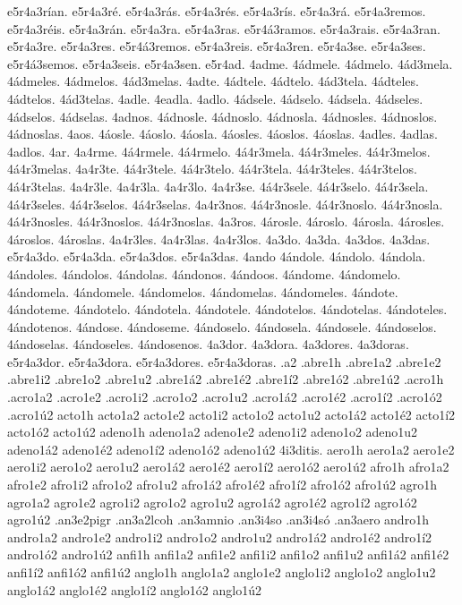 {e5r4a3rían.
e5r4a3ré.
e5r4a3rás.
e5r4a3rés.
e5r4a3rís.
e5r4a3rá.
e5r4a3remos.
e5r4a3réis.
e5r4a3rán.
e5r4a3ra.
e5r4a3ras.
e5r4á3ramos.
e5r4a3rais.
e5r4a3ran.
e5r4a3re.
e5r4a3res.
e5r4á3remos.
e5r4a3reis.
e5r4a3ren.
e5r4a3se.
e5r4a3ses.
e5r4á3semos.
e5r4a3seis.
e5r4a3sen.
e5r4ad.
4adme.
4ádmele.
4ádmelo.
4ád3mela.
4ádmeles.
4ádmelos.
4ád3melas.
4adte.
4ádtele.
4ádtelo.
4ád3tela.
4ádteles.
4ádtelos.
4ád3telas.
4adle.
4eadla.
4adlo.
4ádsele.
4ádselo.
4ádsela.
4ádseles.
4ádselos.
4ádselas.
4adnos.
4ádnosle.
4ádnoslo.
4ádnosla.
4ádnosles.
4ádnoslos.
4ádnoslas.
4aos.
4áosle.
4áoslo.
4áosla.
4áosles.
4áoslos.
4áoslas.
4adles.
4adlas.
4adlos.
4ar.
4a4rme.
4á4rmele.
4á4rmelo.
4á4r3mela.
4á4r3meles.
4á4r3melos.
4á4r3melas.
4a4r3te.
4á4r3tele.
4á4r3telo.
4á4r3tela.
4á4r3teles.
4á4r3telos.
4á4r3telas.
4a4r3le.
4a4r3la.
4a4r3lo.
4a4r3se.
4á4r3sele.
4á4r3selo.
4á4r3sela.
4á4r3seles.
4á4r3selos.
4á4r3selas.
4a4r3nos.
4á4r3nosle.
4á4r3noslo.
4á4r3nosla.
4á4r3nosles.
4á4r3noslos.
4á4r3noslas.
4a3ros.
4árosle.
4ároslo.
4árosla.
4árosles.
4ároslos.
4ároslas.
4a4r3les.
4a4r3las.
4a4r3los.
4a3do.
4a3da.
4a3dos.
4a3das.
e5r4a3do.
e5r4a3da.
e5r4a3dos.
e5r4a3das.
4ando
4ándole.
4ándolo.
4ándola.
4ándoles.
4ándolos.
4ándolas.
4ándonos.
4ándoos.
4ándome.
4ándomelo.
4ándomela.
4ándomele.
4ándomelos.
4ándomelas.
4ándomeles.
4ándote.
4ándoteme.
4ándotelo.
4ándotela.
4ándotele.
4ándotelos.
4ándotelas.
4ándoteles.
4ándotenos.
4ándose.
4ándoseme.
4ándoselo.
4ándosela.
4ándosele.
4ándoselos.
4ándoselas.
4ándoseles.
4ándosenos.
4a3dor.
4a3dora.
4a3dores.
4a3doras.
e5r4a3dor.
e5r4a3dora.
e5r4a3dores.
e5r4a3doras.
.a2
.abre1h
.abre1a2 .abre1e2 .abre1i2 .abre1o2 .abre1u2
.abre1á2 .abre1é2 .abre1í2 .abre1ó2 .abre1ú2
.acro1h
.acro1a2 .acro1e2 .acro1i2 .acro1o2 .acro1u2
.acro1á2 .acro1é2 .acro1í2 .acro1ó2 .acro1ú2
acto1h
acto1a2 acto1e2 acto1i2 acto1o2 acto1u2
acto1á2 acto1é2 acto1í2 acto1ó2 acto1ú2
adeno1h
adeno1a2 adeno1e2 adeno1i2 adeno1o2 adeno1u2
adeno1á2 adeno1é2 adeno1í2 adeno1ó2 adeno1ú2
4i3ditis.
aero1h
aero1a2 aero1e2 aero1i2 aero1o2 aero1u2
aero1á2 aero1é2 aero1í2 aero1ó2 aero1ú2
afro1h
afro1a2 afro1e2 afro1i2 afro1o2 afro1u2
afro1á2 afro1é2 afro1í2 afro1ó2 afro1ú2
agro1h
agro1a2 agro1e2 agro1i2 agro1o2 agro1u2
agro1á2 agro1é2 agro1í2 agro1ó2 agro1ú2
.an3e2pigr
.an3a2lcoh
.an3amnio
.an3i4so
.an3i4só
.an3aero
andro1h
andro1a2 andro1e2 andro1i2 andro1o2 andro1u2
andro1á2 andro1é2 andro1í2 andro1ó2 andro1ú2
anfi1h
anfi1a2 anfi1e2 anfi1i2 anfi1o2 anfi1u2
anfi1á2 anfi1é2 anfi1í2 anfi1ó2 anfi1ú2
anglo1h
anglo1a2 anglo1e2 anglo1i2 anglo1o2 anglo1u2
anglo1á2 anglo1é2 anglo1í2 anglo1ó2 anglo1ú2
}
